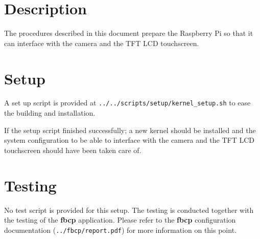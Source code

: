 \section{Description}
The procedures described in this document prepare the Raspberry Pi so that it
can interface with the camera and the TFT LCD touchscreen.

\section{Setup}
A set up script is provided at \texttt{../../scripts/setup/kernel\_setup.sh} to
ease the building and installation.

If the setup script finished successfully; a new kernel should be installed and
the system configuration to be able to interface with the camera and the TFT LCD
touchscreen should have been taken care of.

\section{Testing}
No test script is provided for this setup. The testing is conducted together
with the testing of the \textbf{fbcp} application. Please refer to the
\textbf{fbcp} configuration documentation (\texttt{../fbcp/report.pdf}) for
more information on this point.
